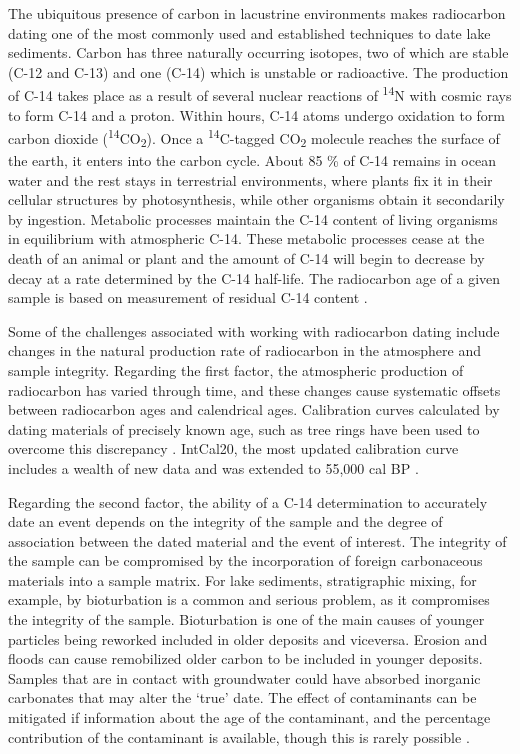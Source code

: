 \documentclass[
  12pt,
]{book}
\begin{document}
The ubiquitous presence of carbon in lacustrine environments makes radiocarbon dating one of the most commonly used and established techniques to date lake sediments. Carbon has three naturally occurring isotopes, two of which are stable (C-12 and C-13) and one (C-14) which is unstable or radioactive. The production of C-14 takes place as a result of several nuclear reactions of \textsuperscript{14}N with cosmic rays to form C-14 and a proton. Within hours, C-14 atoms undergo oxidation to form carbon dioxide (\textsuperscript{14}CO\textsubscript{2}). Once a \textsuperscript{14}C-tagged CO\textsubscript{2} molecule reaches the surface of the earth, it enters into the carbon cycle. About 85 \% of C-14 remains in ocean water and the rest stays in terrestrial environments, where plants fix it in their cellular structures by photosynthesis, while other organisms obtain it secondarily by ingestion. Metabolic processes maintain the C-14 content of living organisms in equilibrium with atmospheric C-14. These metabolic processes cease at the death of an animal or plant and the amount of C-14 will begin to decrease by decay at a rate determined by the C-14 half-life. The radiocarbon age of a given sample is based on measurement of residual C-14 content \citep{aitkenSciencebasedDatingArchaeology1990, woodRevolutionConventionPresent2015}.

Some of the challenges associated with working with radiocarbon dating include changes in the natural production rate of radiocarbon in the atmosphere and sample integrity. Regarding the first factor, the atmospheric production of radiocarbon has varied through time, and these changes cause systematic offsets between radiocarbon ages and calendrical ages. Calibration curves calculated by dating materials of precisely known age, such as tree rings have been used to overcome this discrepancy \citep{aitkenSciencebasedDatingArchaeology1990}. IntCal20, the most updated calibration curve includes a wealth of new data and was extended to 55,000 cal BP \citep{reimerIntCal20NorthernHemisphere2020}.

Regarding the second factor, the ability of a C-14 determination to accurately date an event depends on the integrity of the sample and the degree of association between the dated material and the event of interest. The integrity of the sample can be compromised by the incorporation of foreign carbonaceous materials into a sample matrix. For lake sediments, stratigraphic mixing, for example, by bioturbation is a common and serious problem, as it compromises the integrity of the sample. Bioturbation is one of the main causes of younger particles being reworked included in older deposits and viceversa. Erosion and floods can cause remobilized older carbon to be included in younger deposits. Samples that are in contact with groundwater could have absorbed inorganic carbonates that may alter the `true' date. The effect of contaminants can be mitigated if information about the age of the contaminant, and the percentage contribution of the contaminant is available, though this is rarely possible \citep{aitkenSciencebasedDatingArchaeology1990, woodRevolutionConventionPresent2015}.
\end{document}

